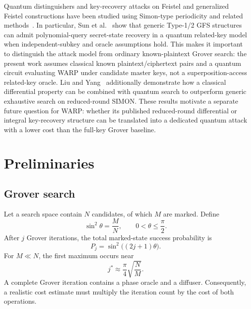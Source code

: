 \documentclass[pdflatex,sn-nature]{sn-jnl}
\theoremstyle{thmstyleone}
\theoremstyle{thmstyletwo}
\begin{document}
Quantum distinguishers and key-recovery attacks on Feistel and generalized Feistel constructions have been studied using Simon-type periodicity and related methods~\cite{Dong2019,Hodzic2022,Sun2023,Sun2026}. In particular, Sun et al.~\cite{Sun2026} show that generic Type-1/2 GFS structures can admit polynomial-query secret-state recovery in a quantum related-key model when independent-subkey and oracle assumptions hold. This makes it important to distinguish the attack model from ordinary known-plaintext Grover search: the present work assumes classical known plaintext/ciphertext pairs and a quantum circuit evaluating WARP under candidate master keys, not a superposition-access related-key oracle. Liu and Yang~\cite{LiuYang2020} additionally demonstrate how a classical differential property can be combined with quantum search to outperform generic exhaustive search on reduced-round SIMON. These results motivate a separate future question for WARP: whether its published reduced-round differential or integral key-recovery structure can be translated into a dedicated quantum attack with a lower cost than the full-key Grover baseline.

\section{Preliminaries}

\subsection{Grover search}
Let a search space contain $N$ candidates, of which $M$ are marked. Define
\begin{equation}
    \sin^2\theta = \frac{M}{N}, \qquad 0<\theta\le \frac{\pi}{2}.
\end{equation}
After $j$ Grover iterations, the total marked-state success probability is
\begin{equation}
    P_j = \sin^2\bigl((2j+1)\theta\bigr).
    \label{eq:grover_success}
\end{equation}
For $M\ll N$, the first maximum occurs near
\begin{equation}
    j^* \approx \frac{\pi}{4}\sqrt{\frac{N}{M}}.
    \label{eq:grover_iterations}
\end{equation}
A complete Grover iteration contains a phase oracle and a diffuser. Consequently, a realistic cost estimate must multiply the iteration count by the cost of both operations.
\end{document}
